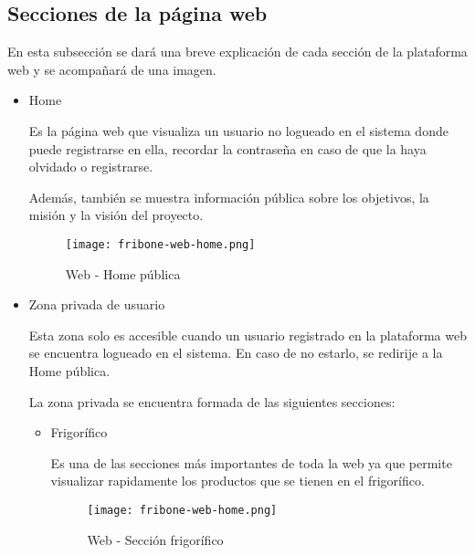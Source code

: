 \subsection{Secciones de la página web}

    En esta subsección se dará una breve explicación de cada sección de la plataforma web y se acompañará de una imagen.

    \begin{itemize}
        \item Home

        Es la página web que visualiza un usuario no logueado en el sistema donde puede registrarse en ella, recordar la contraseña en caso de que la haya olvidado o registrarse.

        Además, también se muestra información pública sobre los objetivos, la misión y la visión del proyecto.

            \begin{figure}[H]
                \centering
                \texttt{[image: fribone-web-home.png]}
                \caption{Web - Home pública}\label{fig:fribone-web-home}
            \end{figure}

        \item Zona privada de usuario

            Esta zona solo es accesible cuando un usuario registrado en la plataforma web se encuentra logueado en el sistema. En caso de no estarlo, se redirije a la Home pública.

            La zona privada se encuentra formada de las siguientes secciones:

            \begin{itemize}
                \item Frigorífico

                Es una de las secciones más importantes de toda la web ya que permite visualizar rapidamente los productos que se tienen en el frigorífico.

                \begin{figure}[H]
                    \centering
                    \texttt{[image: fribone-web-home.png]}
                    \caption{Web - Sección frigorífico}\label{fig:fribone-web-home}
                \end{figure}



\end{itemize}
\end{itemize}
